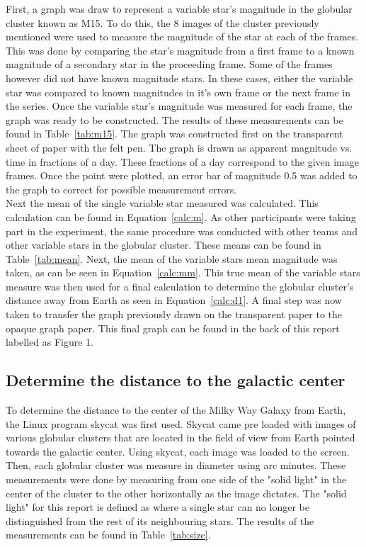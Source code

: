 \documentclass{article}
\begin{document}
First, a graph was draw to represent a variable star's magnitude in the globular cluster
known as M15. To do this, the 8 images of the cluster previously mentioned were used to
measure the magnitude of the star at each of the frames. This was done by comparing the
star's magnitude from a first frame to a known magnitude of a secondary star in the proceeding
frame. Some of the frames however did not have known magnitude stars. In these cases, either
the variable star was compared to known magnitudes in it's own frame or the next frame in
the series. Once the variable star's magnitude was measured for each frame, the graph
was ready to be constructed. The results of these measurements can be found in
Table~\ref{tab:m15}. The graph was constructed first on the transparent sheet of paper with
the felt pen. The graph is drawn as apparent magnitude vs. time in fractions of a day.
These fractions of a day correspond to the given image frames. Once the point were plotted,
an error bar of magnitude 0.5 was added to the graph to correct for possible measurement
errors. \\

Next the mean of the single variable star measured was calculated. This calculation
can be found in Equation~\ref{calc:m}. As other participants were taking part in the
experiment, the same procedure was conducted with other teams and other variable stars
in the globular cluster. These means can be found in Table~\ref{tab:mean}. Next, 
the mean of the variable stars mean magnitude was taken, as can be seen in 
Equation~\ref{calc:mm}. This true mean of the variable stars measure was then used
for a final calculation to determine the globular cluster's distance away from Earth
as seen in Equation~\ref{calc:d1}. A final step was now taken to transfer the 
graph previously drawn on the transparent paper to the opaque graph paper. This final
graph can be found in the back of this report labelled as Figure 1.

\subsection{Determine the distance to the galactic center}

To determine the distance to the center of the Milky Way Galaxy from Earth, the Linux
program skycat was first used. Skycat came pre loaded with images of various globular
clusters that are located in the field of view from Earth pointed towards the 
galactic center. Using skycat, each image was loaded to the screen. Then, each globular
cluster was measure in diameter using arc minutes. These measurements were done by 
measuring from one side of the "solid light" in the center of the cluster to the other
horizontally as the image dictates. The "solid light" for this report is defined as
where a single star can no longer be distinguished from the rest of its neighbouring 
stars. The results of the measurements can be found in Table~\ref{tab:size}. \\
\end{document}
